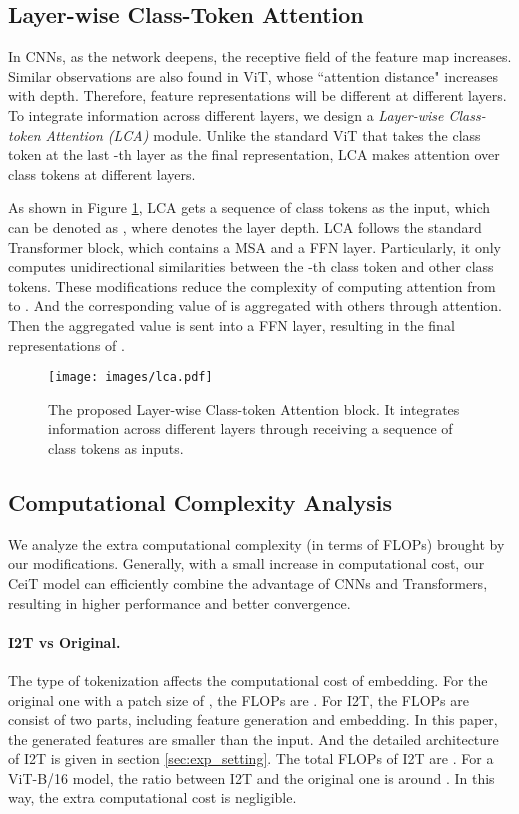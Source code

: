 \documentclass[10pt,twocolumn,letterpaper]{article}
\begin{document}
\subsection{Layer-wise Class-Token Attention}\label{sec:lca}

In CNNs, as the network deepens, the receptive field of the feature map increases. Similar observations are also found in ViT, whose ``attention distance" increases with depth. Therefore, feature representations will be different at different layers. To integrate information across different layers, we design a \textit{Layer-wise Class-token Attention (LCA)} module. Unlike the standard ViT that takes the class token  at the last -th layer as the final representation, LCA makes attention over class tokens at different layers.

As shown in Figure \ref{fig:lca}, LCA gets a sequence of class tokens as the input, which can be denoted as , where  denotes the layer depth. LCA follows the standard Transformer block, which contains a MSA and a FFN layer. Particularly, it only computes unidirectional similarities between the -th class token  and other class tokens. These modifications reduce the complexity of computing attention from  to . And the corresponding value of  is aggregated with others through attention. Then the aggregated value is sent into a FFN layer, resulting in the final representations of .

\begin{figure}[t!]
  \centering
  \texttt{[image: images/lca.pdf]}
  \caption{The proposed Layer-wise Class-token Attention block. It integrates information across different layers through receiving a sequence of class tokens as inputs.}
  \label{fig:lca}
\end{figure}



\subsection{Computational Complexity Analysis}\label{sec:complexity}

We analyze the extra computational complexity (in terms of FLOPs) brought by our modifications. Generally, with a small increase in computational cost, our CeiT model can efficiently combine the advantage of CNNs and Transformers, resulting in higher performance and better convergence.

\paragraph{I2T vs Original.} The type of tokenization affects the computational cost of embedding. For the original one with a patch size of , the FLOPs are . For I2T, the FLOPs are consist of two parts, including feature generation and embedding. In this paper, the generated features are  smaller than the input. And the detailed architecture of I2T is given in section \ref{sec:exp_setting}. The total FLOPs of I2T are . For a ViT-B/16 model, the ratio between I2T and the original one is around . In this way, the extra computational cost is negligible.
\end{document}
